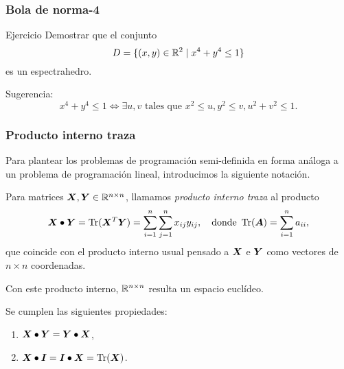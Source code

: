 \documentclass[aspectratio=169,12pt,spanish]{beamer}
\begin{document}

\begin{frame}
\frametitle{Bola de norma-4}

\begin{block}{Ejercicio}
Demostrar que el conjunto
$$D = \{(x,y) \in \mathbb{R}^2 \mid x^4 + y^4 \le 1\}$$
es un espectrahedro.
\end{block}

Sugerencia:
$$
x^4 + y^4 \le 1 \iff \exists u, v \text{ tales que } x^2 \le u, y^2 \le v, u^2 + v^2 \le 1.
$$

\end{frame}





\begin{frame}

\frametitle{Producto interno traza}

Para plantear los problemas de programación semi-definida en forma análoga a un problema de programación lineal, introducimos la siguiente notación.

Para matrices $\bm{X}, \bm{Y} \in \mathbb{R}^{n \times n}$, llamamos \emph{producto interno traza} al producto
$$
\bm{X} \bullet \bm{Y} = \operatorname{Tr}(\bm{X}^T \bm{Y}) = \sum_{i=1}^n\sum_{j=1}^n x_{ij} y_{ij}, \quad \text{donde } \operatorname{Tr}(\bm{A}) = \sum_{i=1}^n a_{ii},
$$
que coincide con el producto interno usual pensado a $\bm{X}$ e $\bm{Y}$ como vectores de $n \times n$ coordenadas.

Con este producto interno, $\mathbb{R}^{n \times n}$ resulta un espacio euclídeo.

Se cumplen las siguientes propiedades:
\begin{enumerate}
\item $\bm{X} \bullet \bm{Y} = \bm{Y} \bullet \bm{X}$,
\item $\bm{X} \bullet \bm{I} = \bm{I} \bullet \bm{X} = \operatorname{Tr}(\bm{X})$.
\end{enumerate}

\end{frame}

\end{document}
